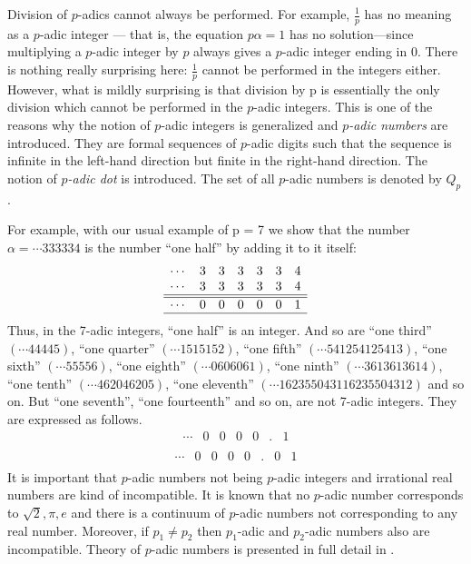 \documentclass{llncs}
\begin{document}
Division of $p$-adics  cannot always be
performed. For example, $\frac{1}{p}$ has no meaning as a $p$-adic integer — that is, the
equation $p\alpha  = 1$  has no solution—since multiplying a $p$-adic integer by $p$ always
gives a $p$-adic integer ending in $0$. There is nothing really surprising here: $\frac{1}{p}$
cannot be performed in the integers either.
However, what is mildly surprising is that division by p is essentially the only
division which cannot be performed in the $p$-adic integers.  This is one of the reasons why the notion of
$p$-adic integers is generalized and {\em $p$-adic numbers} are introduced. They are formal sequences 
of $p$-adic digits such that the sequence is infinite in the left-hand direction but finite in the
right-hand direction. The notion of {\em $p$-adic dot} is introduced. The set of all $p$-adic numbers is denoted by 
$Q_p$.


For example, with our usual example of p = 7 we show that the number
$\alpha  = \cdots 333334$  is the number “one half” by adding it to it itself:   
$$
\begin{array}{rrrrrrrr|}
\cdots &3&3&3&3&3&4\\
\cdots & 3& 3 &3& 3 & 3& 4\\
\hline
\hline
\cdots &0& 0& 0& 0& 0 & 1 \\
\hline
\end{array}
$$
Thus, in the 7-adic integers, “one half” is an integer. And so are “one third”
$(\cdots 44445)$, “one quarter” $(\cdots 1515152)$, “one fifth” $(\cdots 541254125413)$, “one
sixth” $(\cdots 55556)$, “one eighth” $(\cdots 0606061)$, “one ninth” $(\cdots 3613613614)$, “one
tenth” $(\cdots  462046205)$, “one eleventh” $(\cdots 162355043116235504312)$ and so on.
But “one seventh”, “one fourteenth” and so on, are not 7-adic integers. They are expressed as follows.
$$
\begin{array}{rrrrrrrr|}
\cdots &0&0&0&0&.&1\\
\end{array}
$$
$$
\begin{array}{rrrrrrrrr|}
\cdots &0&0&0&0&.&0&1\\
\end{array}
$$
It is important that $p$-adic numbers not being $p$-adic integers and irrational real numbers are kind of incompatible.
It is known that no $p$-adic number corresponds to $\sqrt{2}, \pi , e$ and there is a continuum of $p$-adic numbers
not corresponding to any real number. Moreover, if $p_1 \neq p_2$ then $p_1$-adic and $p_2$-adic numbers also are
incompatible.
Theory of $p$-adic numbers is presented in full detail in \cite{G83,K84}.
\end{document}
